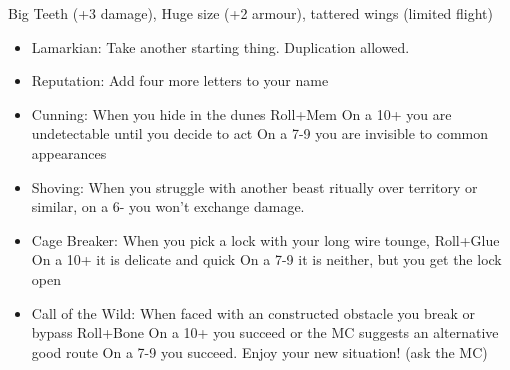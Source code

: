  Big Teeth (+3 damage), Huge size (+2 armour), tattered wings (limited flight)
\begin{itemize}
\item  Lamarkian: Take another starting thing. Duplication allowed.
\item  Reputation: Add four more letters to your name
\item  Cunning: When you hide in the dunes Roll+Mem
\myitem On a 10+ you are undetectable until you decide to act
\myitemend On a 7-9 you are invisible to common appearances
\item  Shoving: When you struggle with another beast ritually over territory or similar, on a 6- you won't exchange damage.
\item  Cage Breaker: When you pick a lock with your long wire tounge, Roll+Glue
\myitem On a 10+ it is delicate and quick
\myitemend On a 7-9 it is neither, but you get the lock open
\item  Call of the Wild: When faced with an constructed obstacle you break or bypass Roll+Bone
\myitem On a 10+ you succeed or the MC suggests an alternative good route
\myitemend On a 7-9 you succeed. Enjoy your new situation! (ask the MC)
\end{itemize}


\newpage
